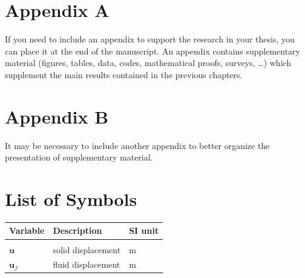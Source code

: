 \documentclass{report}
\begin{document}


\cleardoublepage
{} %
\appendix
\chapter{Appendix A}
If you need to include an appendix to support the research in your thesis, you can place it at the end of the manuscript.
An appendix contains supplementary material (figures, tables, data, codes, mathematical proofs, surveys, \dots)
which supplement the main results contained in the previous chapters.

\chapter{Appendix B}
It may be necessary to include another appendix to better organize the presentation of supplementary material.


\listoffigures

\listoftables

\chapter*{List of Symbols} %
\begin{table}[H]
    \centering
    \begin{tabular}{lll}
        \textbf{Variable} & \textbf{Description} & \textbf{SI unit} \\\hline\\[-9px]
        $\bm{u}$ & solid displacement & m \\[2px]
        $\bm{u}_f$ & fluid displacement & m \\[2px]
    \end{tabular}
\end{table}

\end{document}
